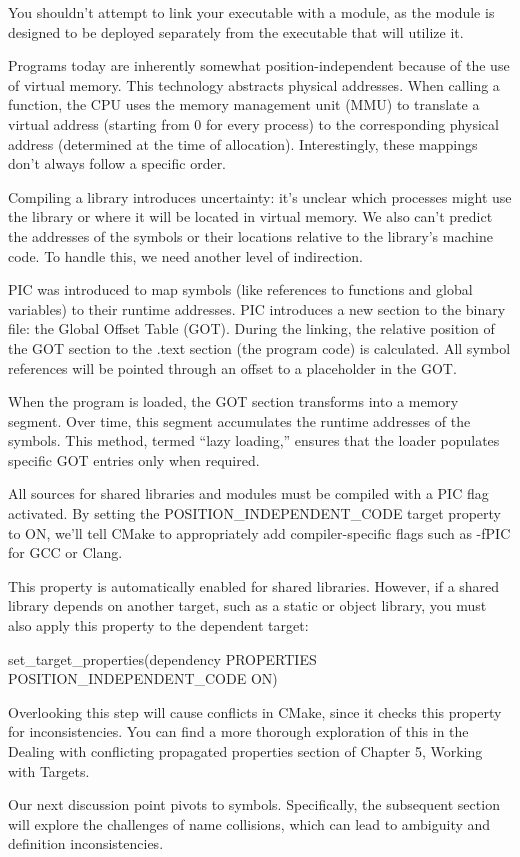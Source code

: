 You shouldn’t attempt to link your executable with a module, as the module is designed to be deployed separately from the executable that will utilize it.


Programs today are inherently somewhat position-independent because of the use of virtual memory. This technology abstracts physical addresses. When calling a function, the CPU uses the memory management unit (MMU) to translate a virtual address (starting from 0 for every process) to the corresponding physical address (determined at the time of allocation). Interestingly, these mappings don’t always follow a specific order.

Compiling a library introduces uncertainty: it’s unclear which processes might use the library or where it will be located in virtual memory. We also can’t predict the addresses of the symbols or their locations relative to the library’s machine code. To handle this, we need another level of indirection.

PIC was introduced to map symbols (like references to functions and global variables) to their runtime addresses. PIC introduces a new section to the binary file: the Global Offset Table (GOT). During the linking, the relative position of the GOT section to the .text section (the program code) is calculated. All symbol references will be pointed through an offset to a placeholder in the GOT.

When the program is loaded, the GOT section transforms into a memory segment. Over time, this segment accumulates the runtime addresses of the symbols. This method, termed “lazy loading,” ensures that the loader populates specific GOT entries only when required.

All sources for shared libraries and modules must be compiled with a PIC flag activated. By setting the POSITION\_INDEPENDENT\_CODE target property to ON, we’ll tell CMake to appropriately add compiler-specific flags such as -fPIC for GCC or Clang.

This property is automatically enabled for shared libraries. However, if a shared library depends on another target, such as a static or object library, you must also apply this property to the dependent target:

\begin{shell}
set_target_properties(dependency
                      PROPERTIES POSITION_INDEPENDENT_CODE ON)
\end{shell}

Overlooking this step will cause conflicts in CMake, since it checks this property for inconsistencies. You can find a more thorough exploration of this in the Dealing with conflicting propagated properties section of Chapter 5, Working with Targets.

Our next discussion point pivots to symbols. Specifically, the subsequent section will explore the challenges of name collisions, which can lead to ambiguity and definition inconsistencies.











